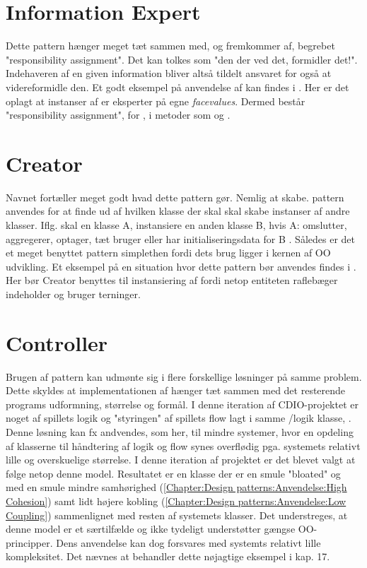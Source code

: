 \section{Information Expert}\label{Chapter:Design patterns:Anvendelse:Information Expert}
Dette pattern hænger meget tæt sammen med, og fremkommer af, begrebet "responsibility assignment". Det kan tolkes som "den der ved det, formidler det!". Indehaveren af en given information bliver altså tildelt ansvaret for også at videreformidle den. Et godt eksempel på anvendelse af  kan findes i . Her er det oplagt at instanser af  er eksperter på egne \textit{facevalues}. Dermed består "responsibility assignment", for , i metoder som  og . 

\section{Creator}\label{Chapter:Design patterns:Anvendelse:Creator}
Navnet fortæller meget godt hvad dette pattern gør. Nemlig at skabe.  pattern anvendes for at finde ud af hvilken klasse der skal skal skabe instanser af andre klasser. Iflg.  skal en klasse A, instansiere en anden klasse B, hvis A: omslutter, aggregerer, optager, tæt bruger eller har initialiseringsdata for B \cite{umlbook}. Således er det et meget benyttet pattern simplethen fordi dets brug ligger i kernen af OO udvikling. Et eksempel på en situation hvor dette pattern bør anvendes findes i . Her bør Creator benyttes til instansiering af  fordi netop entiteten raflebæger indeholder og bruger terninger. 

\section{Controller}\label{Chapter:Design patterns:Anvendelse:Controller}
Brugen af  pattern kan udmønte sig i flere forskellige løsninger på samme problem. Dette skyldes at implementationen af  hænger tæt sammen med det resterende programs udformning, størrelse og formål. I denne iteration af CDIO-projektet er noget af spillets logik og "styringen" af spillets flow lagt i samme /logik klasse, . Denne løsning kan fx andvendes, som her, til mindre systemer, hvor en opdeling af klasserne til håndtering af logik og flow synes overflødig pga. systemets relativt lille og overskuelige størrelse. I denne iteration af projektet er det blevet valgt at følge netop denne model. Resultatet er en klasse  der er en smule "bloated" og med en smule mindre samhørighed (\vref{Chapter:Design patterns:Anvendelse:High Cohesion}) samt lidt højere kobling (\vref{Chapter:Design patterns:Anvendelse:Low Coupling}) sammenlignet med resten af systemets klasser. Det understreges, at denne model er et særtilfælde og ikke tydeligt understøtter gængse OO-principper. Dens anvendelse kan dog forsvares med systemts relativt lille kompleksitet. Det nævnes at \cite{umlbook} behandler dette nøjagtige eksempel i kap. 17.

